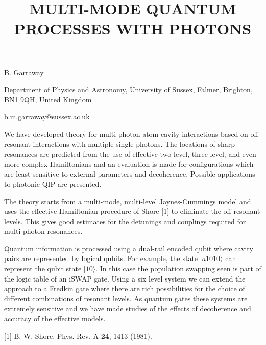 \title{MULTI-MODE QUANTUM PROCESSES WITH PHOTONS}

\underline{B. Garraway} 

{\normalsize{\vspace{-4mm}
Department of Physics and Astronomy, University of Sussex, Falmer,
Brighton, BN1 9QH, United Kingdom

\email b.m.garraway@sussex.ac.uk}}

We have developed theory for multi-photon atom-cavity interactions based on off-resonant interactions with multiple single photons. The locations of sharp resonances are predicted from the use of effective two-level, three-level, and even more complex Hamiltonians and an evaluation is made for configurations which are least sensitive to external parameters and decoherence. Possible applications to photonic QIP are presented.

The theory starts from a multi-mode, multi-level Jaynes-Cummings model and uses the effective Hamiltonian procedure of Shore [1] to eliminate the off-resonant levels. This gives good estimates for the detunings and couplings required for multi-photon resonances.

Quantum information is processed using a dual-rail encoded qubit where cavity pairs are represented by logical qubits. For example, the state $|a1010\rangle$ can represent the qubit state $|10\rangle$. In this case the population swapping seen is part of the logic table of an iSWAP gate. Using a six level system we can extend the approach to a Fredkin gate where there are rich possibilities for the choice of different combinations of resonant levels. As quantum gates these systems are extremely sensitive and we have made studies of the effects of decoherence and accuracy of the effective models.

{\normalsize
[1] B. W. Shore, Phys. Rev. A \textbf{24}, 1413 (1981).
}

\vspace{\baselineskip}
